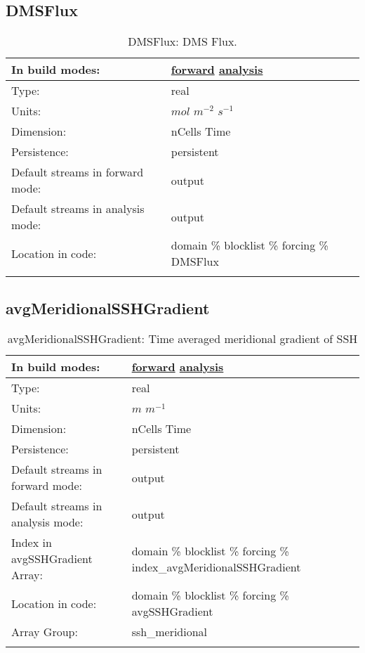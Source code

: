 \subsection[DMSFlux]{DMSFlux}
\label{subsec:var_sec_forcing_DMSFlux}
\begin{center}
\begin{longtable}{| p{2.0in} | p{4.0in} |}
        \hline 
        In build modes: & \hyperref[subsec:forward_var_tab_forcing]{forward} \hyperref[subsec:analysis_var_tab_forcing]{analysis} \\
        \hline 
        Type: & real \\
        \hline 
        Units: & $mol$ $m^{-2}$ $s^{-1}$ \\
        \hline 
        Dimension: & nCells Time \\
        \hline 
        Persistence: & persistent \\
        \hline 
		 Default streams in forward mode: &  output \\
        \hline 
		 Default streams in analysis mode: &  output \\
        \hline 
		 Location in code: & domain \% blocklist \% forcing \% DMSFlux \\
		 \hline 
    \caption{DMSFlux: DMS Flux.}
\end{longtable}
\end{center}
\subsection[avgMeridionalSSHGradient]{avgMeridionalSSHGradient}
\label{subsec:var_sec_forcing_avgMeridionalSSHGradient}
\begin{center}
\begin{longtable}{| p{2.0in} | p{4.0in} |}
        \hline 
        In build modes: & \hyperref[subsec:forward_var_tab_forcing]{forward} \hyperref[subsec:analysis_var_tab_forcing]{analysis} \\
        \hline 
        Type: & real \\
        \hline 
        Units: & $m$ $m^{-1}$ \\
        \hline 
        Dimension: & nCells Time \\
        \hline 
        Persistence: & persistent \\
        \hline 
		 Default streams in forward mode: &  output \\
        \hline 
		 Default streams in analysis mode: &  output \\
        \hline 
		 Index in avgSSHGradient Array: & domain \% blocklist \% forcing \% index\_avgMeridionalSSHGradient \\
		 \hline 
		 Location in code: & domain \% blocklist \% forcing \% avgSSHGradient \\
		 \hline 
		 Array Group: & ssh\_meridional \\
		 \hline 
    \caption{avgMeridionalSSHGradient: Time averaged meridional gradient of SSH}
\end{longtable}
\end{center}
